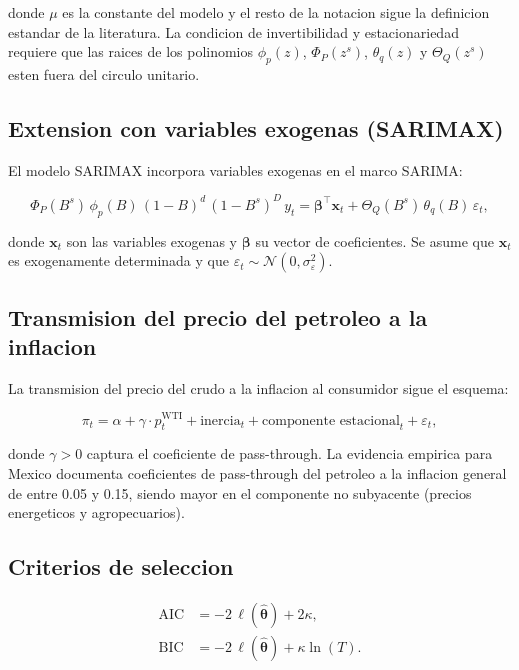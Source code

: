 \documentclass[12pt,a4paper]{article}
\begin{document}
donde $\mu$ es la constante del modelo y el resto de la notacion sigue la definicion estandar de la literatura. La condicion de invertibilidad y estacionariedad requiere que las raices de los polinomios $\phi_p(z)$, $\Phi_P(z^s)$, $\theta_q(z)$ y $\Theta_Q(z^s)$ esten fuera del circulo unitario.

\subsection{Extension con variables exogenas (SARIMAX)}

El modelo SARIMAX incorpora variables exogenas en el marco SARIMA:

\begin{equation}
  \Phi_P(B^s)\,\phi_p(B)\,(1-B)^d\,(1-B^s)^D\,y_t = \boldsymbol{\beta}^\top\mathbf{x}_t + \Theta_Q(B^s)\,\theta_q(B)\,\varepsilon_t,
  \label{eq:sarimax2}
\end{equation}

donde $\mathbf{x}_t$ son las variables exogenas y $\boldsymbol{\beta}$ su vector de coeficientes. Se asume que $\mathbf{x}_t$ es exogenamente determinada y que $\varepsilon_t \sim \mathcal{N}(0,\sigma^2_\varepsilon)$.

\subsection{Transmision del precio del petroleo a la inflacion}

La transmision del precio del crudo a la inflacion al consumidor sigue el esquema:

\begin{equation}
  \pi_t = \alpha + \gamma\cdot p^{\text{WTI}}_t + \text{inercia}_t + \text{componente estacional}_t + \varepsilon_t,
\end{equation}

donde $\gamma > 0$ captura el coeficiente de pass-through. La evidencia empirica para Mexico documenta coeficientes de pass-through del petroleo a la inflacion general de entre 0.05 y 0.15, siendo mayor en el componente no subyacente (precios energeticos y agropecuarios).

\subsection{Criterios de seleccion}

\begin{align}
  \text{AIC} &= -2\,\ell(\hat{\boldsymbol{\theta}}) + 2\kappa, \\
  \text{BIC} &= -2\,\ell(\hat{\boldsymbol{\theta}}) + \kappa\ln(T).
\end{align}
\end{document}
